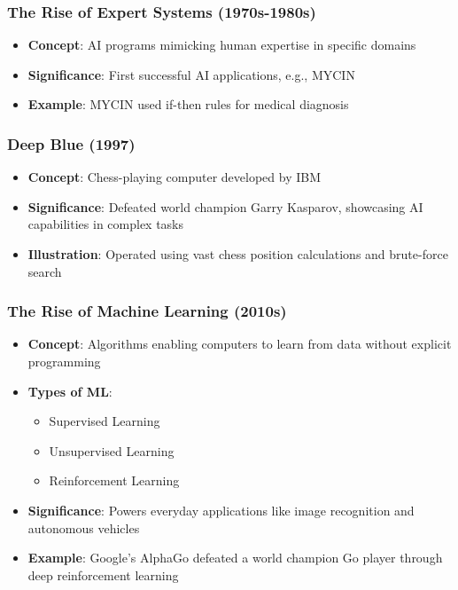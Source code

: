 \documentclass[aspectratio=169]{beamer}
\begin{document}
\begin{frame}[fragile]
    \frametitle{The Rise of Expert Systems (1970s-1980s)}
    \begin{itemize}
        \item \textbf{Concept}: AI programs mimicking human expertise in specific domains
        \item \textbf{Significance}: First successful AI applications, e.g., MYCIN
        \item \textbf{Example}: MYCIN used if-then rules for medical diagnosis
    \end{itemize}
\end{frame}

\begin{frame}[fragile]
    \frametitle{Deep Blue (1997)}
    \begin{itemize}
        \item \textbf{Concept}: Chess-playing computer developed by IBM
        \item \textbf{Significance}: Defeated world champion Garry Kasparov, showcasing AI capabilities in complex tasks
        \item \textbf{Illustration}: Operated using vast chess position calculations and brute-force search
    \end{itemize}
\end{frame}

\begin{frame}[fragile]
    \frametitle{The Rise of Machine Learning (2010s)}
    \begin{itemize}
        \item \textbf{Concept}: Algorithms enabling computers to learn from data without explicit programming
        \item \textbf{Types of ML}:
        \begin{itemize}
            \item Supervised Learning
            \item Unsupervised Learning
            \item Reinforcement Learning
        \end{itemize}
        \item \textbf{Significance}: Powers everyday applications like image recognition and autonomous vehicles
        \item \textbf{Example}: Google's AlphaGo defeated a world champion Go player through deep reinforcement learning
    \end{itemize}
\end{frame}
\end{document}
